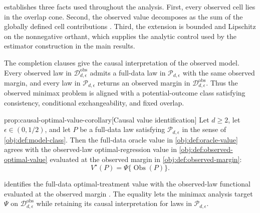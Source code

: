  establishes three facts used throughout the analysis. First, every observed cell lies in the overlap cone. Second, the observed value decomposes as the sum of the globally defined cell contributions . Third, the extension is bounded and Lipschitz on the nonnegative orthant, which supplies the analytic control used by the estimator construction in the main results.

The completion clauses give the causal interpretation of the observed model. Every observed law in \(\mathcal D_{d,\epsilon}^{\mathrm{obs}}\) admits a full-data law in \(\mathcal P_{d,\epsilon}\) with the same observed margin, and every law in \(\mathcal P_{d,\epsilon}\) returns an observed margin in \(\mathcal D_{d,\epsilon}^{\mathrm{obs}}\). Thus the observed minimax problem is aligned with a potential-outcome class satisfying consistency, conditional exchangeability, and fixed overlap.

\begin{propositionv}{prop:causal-optimal-value-corollary}[Causal value identification]
Let \(d\ge 2\), let \(\epsilon\in(0,1/2)\), and let \(P\) be a full-data law satisfying \(\mathcal P_{d,\epsilon}\) in the sense of \cref{obj:def:model-class}. Then the full-data oracle value in \cref{obj:def:oracle-value} agrees with the observed-law optimal-regression value in \cref{obj:def:observed-optimal-value} evaluated at the observed margin in \cref{obj:def:observed-margin}:
\[
V^\star(P)=\Psi\{\operatorname{Obs}(P)\}.
\]
\end{propositionv}

 identifies the full-data optimal-treatment value  with the observed-law functional evaluated at the observed margin . The equality lets the minimax analysis target \(\Psi\) on \(\mathcal D_{d,\epsilon}^{\mathrm{obs}}\) while retaining its causal interpretation for laws in \(\mathcal P_{d,\epsilon}\).
